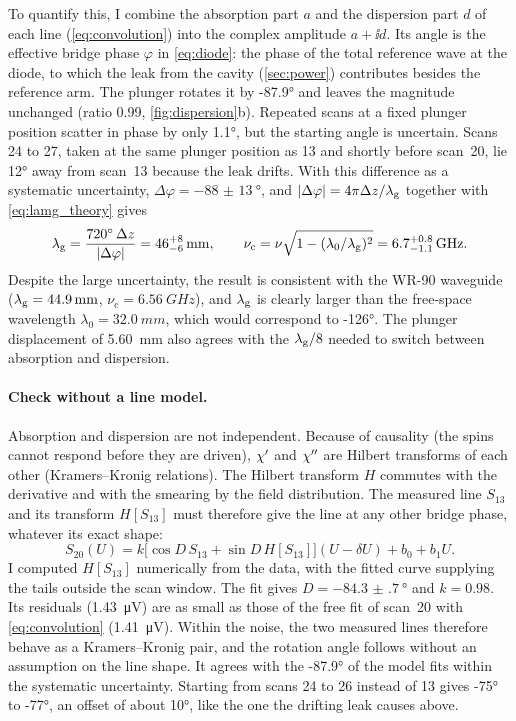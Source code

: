 To quantify this, I combine the absorption part $a$ and the dispersion part $d$ of each line (\cref{eq:convolution}) into the
complex amplitude $a+\ii d$. Its angle is the effective bridge phase $\varphi$ in \cref{eq:diode}: the phase of the
total reference wave at the diode, to which the leak from the cavity (\cref{sec:power}) contributes besides the
reference arm. The plunger rotates it by
\ang{-87.9} and leaves the magnitude unchanged (ratio \num{0.99}, \cref{fig:dispersion}b). Repeated scans at a fixed
plunger position scatter in phase by only \ang{1.1}, but the starting angle is uncertain. Scans 24 to 27, taken at the
same plunger position as 13 and shortly before scan~20, lie \ang{12} away from scan~13 because the leak drifts. With this
difference as a systematic uncertainty, $\Delta\varphi=\qty{-88(13)}{\degree}$, and $|\Delta\varphi|=4\pi\Delta z/\lambda_\mathrm{g}$
together with \cref{eq:lamg_theory} gives
\begin{equation}\label{eq:lamg}
  \lamg=\frac{\ang{720}\,\Delta z}{|\Delta\varphi|}=46^{+8}_{-6}\,\unit{mm},\qquad
  \nu_\mathrm c=\nu\sqrt{1-(\lambda_0/\lamg)^2}=6.7^{+0.8}_{-1.1}\,\unit{GHz}.
\end{equation}
Despite the large uncertainty, the result is consistent with the WR-90 waveguide ($\lambda_\mathrm{g}=\qty{44.9}{mm}$,
$\nu_\mathrm c=\qty{6.56}{GHz}$), and $\lambda_\mathrm{g}$ is clearly larger than the free-space wavelength
$\lambda_0=\qty{32.0}{mm}$, which would correspond to \ang{-126}. The plunger displacement of \qty{5.60}{mm} also agrees
with the $\lambda_\mathrm{g}/8$ needed to switch between absorption and dispersion.

\paragraph{Check without a line model.}
Absorption and dispersion are not independent. Because of causality (the spins cannot respond before they are driven),
$\chi'$ and $\chi''$ are Hilbert transforms of each other (Kramers--Kronig relations). The Hilbert transform $H$ commutes with the
derivative and with the smearing by the field distribution. The measured line $S_{13}$ and its transform $H[S_{13}]$ must
therefore give the line at any other bridge phase, whatever its exact shape:
\begin{equation}\label{eq:hilbert}
  S_{20}(U)=k\bigl[\cos D\,S_{13}+\sin D\,H[S_{13}]\bigr](U-\delta U)+b_0+b_1U .
\end{equation}
I computed $H[S_{13}]$ numerically from the data, with the fitted curve supplying the tails outside the scan window. The
fit gives $D=\qty{-84.3(7)}{\degree}$ and $k=\num{0.98}$. Its residuals (\qty{1.43}{\micro V}) are as small as those of
the free fit of scan~20 with \cref{eq:convolution} (\qty{1.41}{\micro V}). Within the noise, the two measured lines
therefore behave as a Kramers--Kronig pair, and the rotation angle follows without an assumption on the line shape. It
agrees with the \ang{-87.9} of the model fits within the systematic uncertainty. Starting from scans 24 to 26 instead of
13 gives \ang{-75} to \ang{-77}, an offset of about \ang{10}, like the one the drifting leak causes above.

